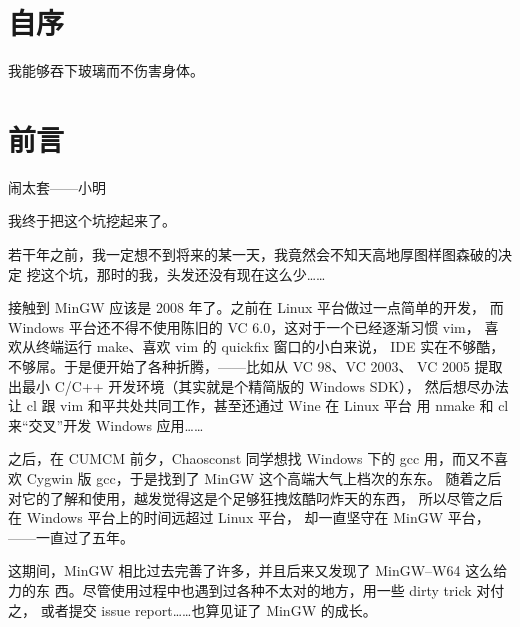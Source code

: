 %
%
%
%

\chapter{自序}
\label{ch:prologue}
我能够吞下玻璃而不伤害身体。

\clearpage{\thispagestyle{empty}\cleardoublepage}

\chapter{前言}
\label{ch:preface}

\begin{flushright}
    闹太套——小明
\end{flushright}

我终于把这个坑挖起来了。

若干年之前，我一定想不到将来的某一天，我竟然会不知天高地厚图样图森破的决定
挖这个坑，那时的我，头发还没有现在这么少……

接触到 MinGW 应该是 2008 年了。之前在 Linux 平台做过一点简单的开发，
而 Windows 平台还不得不使用陈旧的 VC 6.0，这对于一个已经逐渐习惯 vim，
喜欢从终端运行 make、喜欢 vim 的 quickfix 窗口的小白来说，
IDE 实在不够酷，不够屌。于是便开始了各种折腾，——比如从 VC 98、VC 2003、
VC 2005 提取出最小 C/C++ 开发环境（其实就是个精简版的 Windows SDK），
然后想尽办法让 cl 跟 vim 和平共处共同工作，甚至还通过 Wine 在 Linux 平台
用 nmake 和 cl 来“交叉”开发 Windows 应用……

之后，在 CUMCM 前夕，Chaosconst 同学想找 Windows 下的 gcc 用，而又不喜欢
Cygwin 版 gcc，于是找到了 MinGW 这个高端大气上档次的东东。
随着之后对它的了解和使用，越发觉得这是个足够狂拽炫酷叼炸天的东西，
所以尽管之后在 Windows 平台上的时间远超过 Linux 平台，
却一直坚守在 MinGW 平台，——一直过了五年。

这期间，MinGW 相比过去完善了许多，并且后来又发现了 MinGW--W64 这么给力的东
西。尽管使用过程中也遇到过各种不太对的地方，用一些 dirty trick 对付之，
或者提交 issue report……也算见证了 MinGW 的成长。

